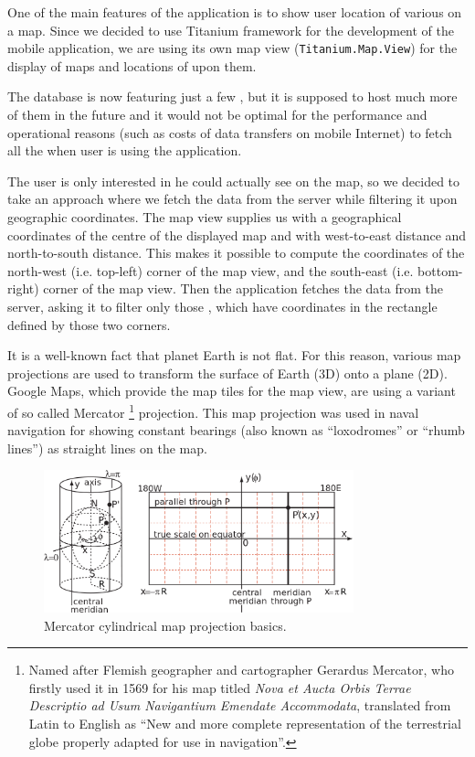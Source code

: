 \documentclass[11pt]{book}
\begin{document}
One of the main features of the application is to show user location of various \wallentityp on a map. Since we decided to use Titanium framework for the development of the mobile application, we are using its own map view (\texttt{Titanium.Map.View}) for the display of maps and locations of \wallentityp upon them.

The database is now featuring just a few \wallentityp, but it is supposed to host much more of them in the future and it would not be optimal for the performance and operational reasons (such as costs of data transfers on mobile Internet) to fetch all the \wallentityp when user is using the application.

The user is only interested in \wallentityp he could actually see on the map, so we decided to take an approach where we fetch the data from the server while filtering it upon geographic coordinates. The map view supplies us with a geographical coordinates of the centre of the displayed map and with west-to-east distance and north-to-south distance. This makes it possible to compute the coordinates of the north-west (i.e. top-left) corner of the map view, and the south-east (i.e. bottom-right) corner of the map view. Then the application fetches the data from the server, asking it to filter only those \wallentityp, which have coordinates in the rectangle defined by those two corners.

It is a well-known fact that planet Earth is not flat. For this reason, various map projections are used to transform the surface of Earth (3D) onto a plane (2D). Google Maps, which provide the map tiles for the map view, are using a variant of so called Mercator \footnote{Named after Flemish geographer and cartographer Gerardus Mercator, who firstly used it in 1569 for his map titled \emph{Nova et Aucta Orbis Terrae Descriptio ad Usum Navigantium Emendate Accommodata}, translated from Latin to English as ``New and more complete representation of the terrestrial globe properly adapted for use in navigation''.} projection. This map projection was used in naval navigation for showing constant bearings (also known as ``loxodromes'' or ``rhumb lines'') as straight lines on the map. \cite{progonos:mercator,radicalcartography}

\begin{figure}[H]
    \centering
    \includegraphics[width=0.8\textwidth]{Figures/Prestudy/mercator.png}
    \caption{Mercator cylindrical map projection basics. \cite{wikipedia:mercator}}
    \label{fig:mercator}
\end{figure}
\end{document}
